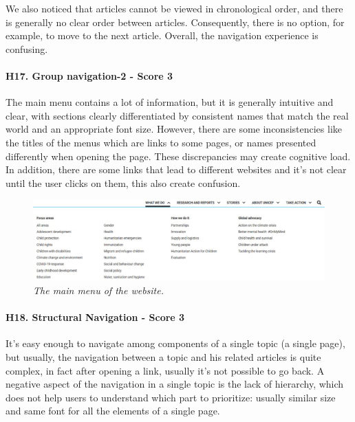 \newline We also noticed that articles cannot be viewed in chronological order, and there is generally no clear order between articles. Consequently, there is no option, for example, to move to the next article.
\newline Overall, the navigation experience is confusing.
\newline
\newline \paragraph{H17. Group navigation-2 - Score 3}  \label{subsec:H17}	The main menu contains a lot of information, but it is generally intuitive and clear, with sections clearly differentiated by consistent names that match the real world and an appropriate font size. However, there are some inconsistencies like the titles of the menus which are links to some pages, or names presented differently when opening the page. These discrepancies may create cognitive load. 
\newline In addition, there are some links that lead to different websites and it’s not clear until the user clicks on them, this also create confusion.
\begin{figure}[!h]
	\begin{center}
		\includegraphics[width=\textwidth]{FinalScores20.jpg}
		\captionsetup{font=small}
		\caption{\textit{The main menu of the website.}}
	\end{center}
\end{figure}
\newline
\newline \paragraph{H18. Structural Navigation - Score 3}  \label{subsec:H18}	It’s easy enough to navigate among components of a single topic (a single page), but usually, the navigation between a topic and his related articles is quite complex, in fact after opening a link, usually it’s not possible to go back.
\newline A negative aspect of the navigation in a single topic is the lack of hierarchy, which does not help users to understand which part to prioritize: usually similar size and same font for all the elements of a single page.
